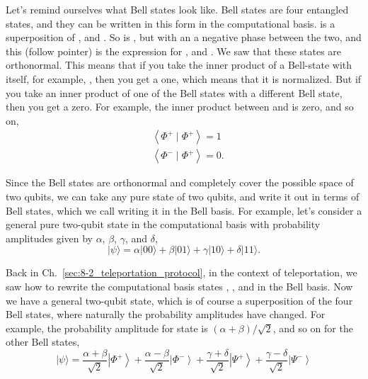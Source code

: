 Let's remind ourselves what Bell states look like.  Bell states are four entangled states, and they can be written in this form in the computational basis. \ket{\Phi^+} is a superposition of  , and  . So is \ket{\Phi^-}, but with an a negative phase between the two, and this (follow pointer) is the expression for \ket{\Psi^+}, and \ket{\Psi^-}. We saw that these states are orthonormal. This means that if you take the inner product of a Bell-state with itself, for example, \ket{\Phi^+}, then you get a one, which means that it is normalized. But if you take an inner product of one of the Bell states with a different Bell state, then you get a zero. For example, the inner product between \ket{\Phi^-} and \ket{\Phi^+} is zero, and so on,
\begin{equation}
\begin{aligned}
&\left\langle\Phi^{+} \mid \Phi^{+}\right\rangle=1 \\
&\left\langle\Phi^{-} \mid \Phi^{+}\right\rangle=0.
\end{aligned}
\end{equation}

Since the Bell states are orthonormal and completely cover the possible space of two qubits, we can take any pure state of two qubits, and write it out in terms of Bell states, which we call writing it in the Bell basis. For example, let's consider a general pure two-qubit state in the computational basis with probability amplitudes given by $\alpha$, $\beta$, $\gamma$, and $\delta$,
\begin{equation}
|\psi\rangle=\alpha|00\rangle+\beta|01\rangle+\gamma|10\rangle+\delta|11\rangle.
\end{equation}

Back in Ch.~\ref{sec:8-2_teleportation_protocol}, in the context of teleportation, we saw how to rewrite the computational basis states , ,  and  in the Bell basis. Now we have a general two-qubit state, which is of course a superposition of the four Bell states, where naturally the probability amplitudes have changed. For example, the probability amplitude for state \ket{\Phi^+} is $(\alpha+\beta)/\sqrt{2}$, and so on for the other Bell states,
\begin{equation}
|\psi\rangle=\frac{\alpha+\beta}{\sqrt{2}}\left|\Phi^{+}\right\rangle+\frac{\alpha-\beta}{\sqrt{2}}\left|\Phi^{-}\right\rangle+\frac{\gamma+\delta}{\sqrt{2}}\left|\Psi^{+}\right\rangle+\frac{\gamma-\delta}{\sqrt{2}}\left|\Psi^{-}\right\rangle
\end{equation}

